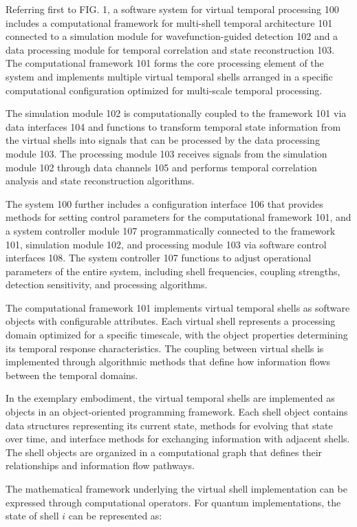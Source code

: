 \documentclass[12pt,letterpaper]{article}
\begin{document}
Referring first to FIG. 1, a software system for virtual temporal processing 100 includes a computational framework for multi-shell temporal architecture 101 connected to a simulation module for wavefunction-guided detection 102 and a data processing module for temporal correlation and state reconstruction 103. The computational framework 101 forms the core processing element of the system and implements multiple virtual temporal shells arranged in a specific computational configuration optimized for multi-scale temporal processing.

The simulation module 102 is computationally coupled to the framework 101 via data interfaces 104 and functions to transform temporal state information from the virtual shells into signals that can be processed by the data processing module 103. The processing module 103 receives signals from the simulation module 102 through data channels 105 and performs temporal correlation analysis and state reconstruction algorithms.

The system 100 further includes a configuration interface 106 that provides methods for setting control parameters for the computational framework 101, and a system controller module 107 programmatically connected to the framework 101, simulation module 102, and processing module 103 via software control interfaces 108. The system controller 107 functions to adjust operational parameters of the entire system, including shell frequencies, coupling strengths, detection sensitivity, and processing algorithms.

The computational framework 101 implements virtual temporal shells as software objects with configurable attributes. Each virtual shell represents a processing domain optimized for a specific timescale, with the object properties determining its temporal response characteristics. The coupling between virtual shells is implemented through algorithmic methods that define how information flows between the temporal domains.

In the exemplary embodiment, the virtual temporal shells are implemented as objects in an object-oriented programming framework. Each shell object contains data structures representing its current state, methods for evolving that state over time, and interface methods for exchanging information with adjacent shells. The shell objects are organized in a computational graph that defines their relationships and information flow pathways.

The mathematical framework underlying the virtual shell implementation can be expressed through computational operators. For quantum implementations, the state of shell $i$ can be represented as:
\end{document}
